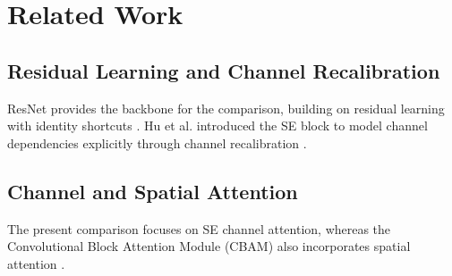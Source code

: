 \section{Related Work}

\subsection{Residual Learning and Channel Recalibration}

ResNet provides the backbone for the comparison, building on residual learning with identity shortcuts \cite{he2016resnet}. Hu et al. introduced the SE block to model channel dependencies explicitly through channel recalibration \cite{hu2018squeeze}.

\subsection{Channel and Spatial Attention}

The present comparison focuses on SE channel attention, whereas the Convolutional Block Attention Module (CBAM) also incorporates spatial attention \cite{woo2018cbam}.
